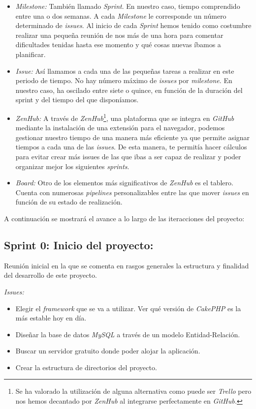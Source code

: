 \begin{itemize}
	\item \textit{Milestone:} También llamado \textit{Sprint}. En nuestro caso, tiempo comprendido entre una o dos semanas. A cada \textit{Milestone} le corresponde un número determinado de \textit{issues}. Al inicio de cada \textit{Sprint} hemos tenido como costumbre realizar una pequeña reunión de nos más de una hora para comentar dificultades tenidas hasta ese momento y qué cosas nuevas íbamos a planificar.
	
	\item \textit{Issue:} Así llamamos a cada una de las pequeñas tareas a realizar en este periodo de tiempo. No hay número máximo de \textit{issues} por \textit{milestone}. En nuestro caso, ha oscilado entre siete o quince, en función de la duración del sprint y del tiempo del que disponíamos.
	
	\item \textit{ZenHub:} A través de \textit{ZenHub}\footnote{Se ha valorado la utilización de alguna alternativa como puede ser \textit{Trello} pero nos hemos decantado por \textit{ZenHub} al integrarse perfectamente en \textit{GitHub.}}, una plataforma que se integra en \textit{GitHub} mediante la instalación de una extensión para el navegador, podemos gestionar nuestro tiempo de una manera más eficiente ya que permite asignar tiempos a cada una de las \textit{issues}. De esta manera, te permitía hacer cálculos para evitar crear más issues de las que ibas a ser capaz de realizar y poder organizar mejor los siguientes \textit{sprints}.
	
	\item \textit{Board:} Otro de los elementos más significativos de \textit{ZenHub} es el tablero. Cuenta con numerosas \textit{pipelines} personalizables entre las que mover \textit{issues} en función de su estado de realización. 
\end{itemize}

A continuación se mostrará el avance a lo largo de las iteracciones del proyecto:

\subsection{Sprint 0: Inicio del proyecto:}

Reunión inicial en la que se comenta en rasgos generales la estructura y finalidad del desarrollo de este proyecto. 

\textit{Issues:}
\begin{itemize}
	\item Elegir el \textit{framework} que se va a utilizar. Ver qué versión de \textit{CakePHP} es la más estable hoy en día.
	\item Diseñar la base de datos \textit{MySQL} a través de un modelo Entidad-Relación. 
	\item Buscar un servidor gratuito donde poder alojar la aplicación.
	\item Crear la estructura de directorios del proyecto.
\end{itemize}

